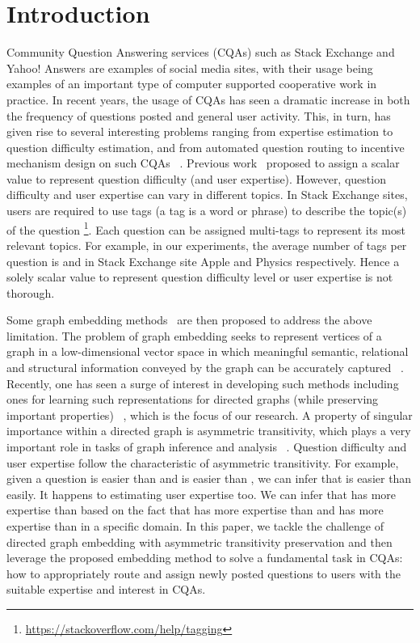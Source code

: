 \documentclass[letterpaper]{article} \usepackage{aaai19}  \usepackage{times}  \usepackage{helvet}  \usepackage{courier}  \usepackage{url}  \usepackage{graphicx}  \usepackage{booktabs} \usepackage{xcolor}
\begin{document}
\section{Introduction}
\label{sec:introduction}

Community Question Answering services (CQAs) such as Stack Exchange and Yahoo! Answers are examples of social media sites, with their usage being examples of an important type of computer supported cooperative work in practice. In recent years, the usage of CQAs
has seen a dramatic increase in both the frequency of questions posted and general user activity.
This, in turn, has given rise to several interesting problems ranging from expertise estimation to question difficulty estimation, and from automated question routing to incentive mechanism design on such CQAs ~\cite{Fang2016QuestionAnswering,QDEE2018}. Previous work~\cite{wang2014,QDEE2018} proposed to assign a scalar value to represent question difficulty (and user expertise). However, question difficulty and user expertise can vary in different topics. In Stack Exchange sites, users are required to use tags (a tag is a word or phrase) to describe the topic(s) of the question \footnote{\url{https://stackoverflow.com/help/tagging}}. Each question can be assigned multi-tags to represent its most relevant topics. For example, in our experiments, the average number of tags per question is  and  in Stack Exchange site Apple and Physics respectively. Hence a solely scalar value to represent question difficulty level or user expertise is not thorough.

Some graph embedding methods~\cite{Fang2016QuestionAnswering,zhaoexpert2016,zhao2017community} are then proposed to address the above limitation. 
The problem of graph embedding seeks to represent vertices of a graph in a low-dimensional vector space in which meaningful semantic, relational and structural information conveyed by the graph can be accurately captured ~\cite{Ma2018WSDM}. Recently, one has seen a surge of interest in developing such methods including ones for learning such representations for directed graphs (while preserving important properties) ~\cite{Ou2016KDDAsymmetric}, which is the focus of our research. A property of singular importance within a directed graph is asymmetric transitivity, which plays a very important role in tasks of graph inference and analysis ~\cite{Ou2016KDDAsymmetric}. Question difficulty and user expertise follow the characteristic of asymmetric transitivity. For example, given a question  is easier than  and  is easier than , we can infer that  is easier than  easily. It happens to estimating user expertise too. We can infer that  has more expertise than  based on the fact that  has more expertise than  and  has more expertise than  in a specific domain. In this paper, we tackle the challenge of directed graph embedding with asymmetric transitivity preservation and then leverage the proposed embedding method to solve a fundamental task in CQAs: how to appropriately route and assign newly posted questions to users with the suitable expertise and interest in CQAs. 
\end{document}

